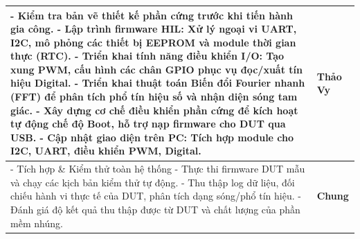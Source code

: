\begin{longtable}{|>{\raggedright\arraybackslash}p{10.7cm} |>{\centering\arraybackslash}p{2.5cm}|}
    - Kiểm tra bản vẽ thiết kế phần cứng trước khi tiến hành gia công.\newline
    - Lập trình firmware HIL: Xử lý ngoại vi UART, I2C, mô phỏng các thiết bị EEPROM và module thời gian thực (RTC).\newline
    - Triển khai tính năng điều khiển I/O: Tạo xung PWM, cấu hình các chân GPIO phục vụ đọc/xuất tín hiệu Digital.\newline
    - Triển khai thuật toán Biến đổi Fourier nhanh (FFT) để phân tích phổ tín hiệu số và nhận diện sóng tam giác.\newline
    - Xây dựng cơ chế điều khiển phần cứng để kích hoạt tự động chế độ Boot, hỗ trợ nạp firmware cho DUT qua USB.\newline
    - Cập nhật giao diện trên PC: Tích hợp module cho I2C, UART, điều khiển PWM, Digital. & 
    \textbf{Thảo Vy} \\
    \hline
    
    - Tích hợp \& Kiểm thử toàn hệ thống\newline
    - Thực thi firmware DUT mẫu và chạy các kịch bản kiểm thử tự động.\newline
    - Thu thập log dữ liệu, đối chiếu hành vi thực tế của DUT, phân tích dạng sóng/phổ tín hiệu.\newline
    - Đánh giá độ kết quả thu thập được từ DUT và chất lượng của phần mềm nhúng. & 
    \textbf{Chung} \\

\end{longtable}
\endgroup
